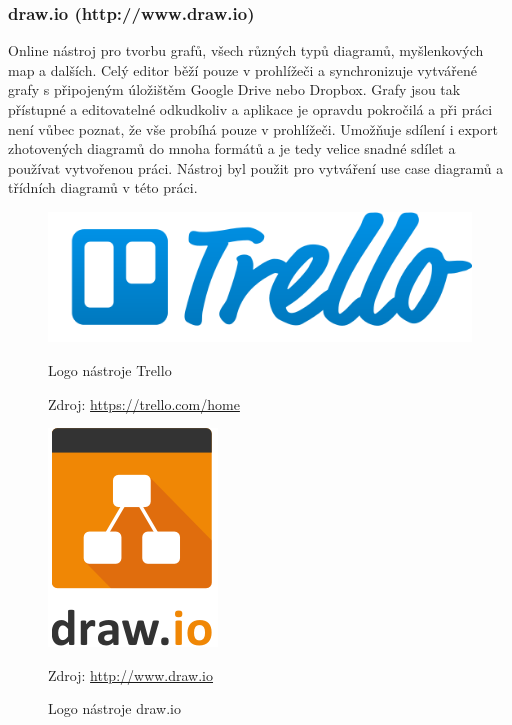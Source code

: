 \documentclass{article}
\begin{document}
\subsubsection{draw.io (http://www.draw.io)}
Online nástroj pro tvorbu grafů, všech různých typů diagramů, myšlenkových map a dalších.
Celý editor běží pouze v prohlížeči a synchronizuje vytvářené grafy s připojeným úložištěm
Google Drive nebo Dropbox. Grafy jsou tak přístupné  a editovatelné odkudkoliv a aplikace
je opravdu pokročilá a při práci není vůbec poznat, že vše probíhá pouze v prohlížeči.
Umožňuje sdílení i export zhotovených diagramů do mnoha formátů a je tedy velice snadné
sdílet a používat vytvořenou práci.
Nástroj byl použit pro vytváření use case diagramů a třídních diagramů v této práci.

\begin{figure}[H]
\begin{minipage}{.5\textwidth}
\centering
                \includegraphics[scale=0.3]{img/trello-logo-blue.png}
        \caption{Logo nástroje Trello}
                \label{fig:trellologo}
                \centering Zdroj: \url{https://trello.com/home}
\end{minipage}
\begin{minipage}{.5\textwidth}
\centering
                \includegraphics[scale=0.2]{img/drawiologo.png}
        \caption{Logo nástroje draw.io}
        \label{fig:iologo}
        \centering Zdroj: \url{http://www.draw.io}
    \end{minipage}
\end{figure}
\end{document}

